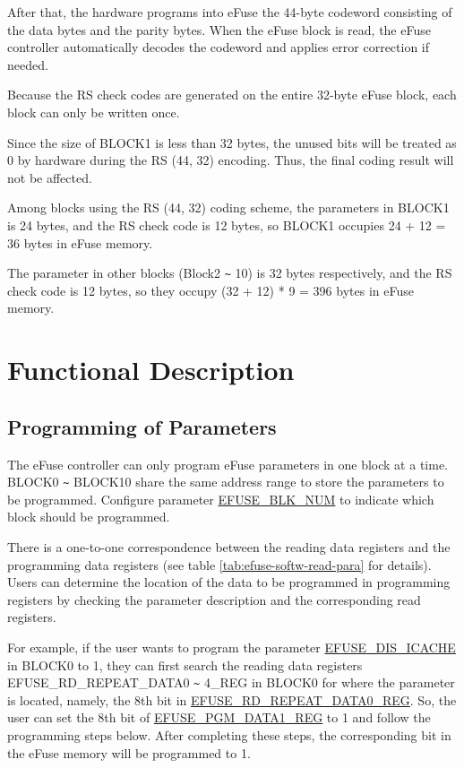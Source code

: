 \documentclass[main\_\_EN.tex]{subfiles}
\begin{document}
After that, the hardware programs into eFuse the 44-byte codeword consisting of the data bytes and the parity bytes. When the eFuse block is read, the eFuse controller automatically decodes the codeword and applies error correction if needed.

Because the RS check codes are generated on the entire 32-byte eFuse block, each block can only be written once.

Since the size of BLOCK1 is less than 32 bytes, the unused bits will be treated as 0 by hardware during the RS (44, 32) encoding. Thus, the final coding result will not be affected.

Among blocks using the RS (44, 32) coding scheme, the parameters in BLOCK1 is 24 bytes, and the RS check code is 12 bytes, so BLOCK1 occupies 24 + 12 = 36 bytes in eFuse memory.

The parameter in other blocks (Block2 \verb+~+ 10) is 32 bytes respectively, and the RS check code is 12 bytes, so they occupy (32 + 12) * 9 = 396 bytes in eFuse memory.


\section{Functional Description}
\label{sec:alias-func-descr}

\subsection{Programming of Parameters}
\label{sec:efuse-software-programming-para}

The eFuse controller can only program eFuse parameters in one block at a time. BLOCK0 \verb+~+ BLOCK10 share the same address range to store the parameters to be programmed. Configure parameter \hyperref[fielddesc:EFUSEBLKNUM]{EFUSE\_BLK\_NUM} to indicate which block should be programmed.

There is a one-to-one correspondence between the reading data registers and the programming data registers (see table \ref{tab:efuse-softw-read-para} for details). Users can determine the location of the data to be programmed in programming registers by checking the parameter description and the corresponding read registers.

For example, if the user wants to program the parameter \hyperref[fielddesc:EFUSEDISICACHE]{EFUSE\_DIS\_ICACHE} in BLOCK0 to 1, they can first search the reading data registers EFUSE\_RD\_REPEAT\_DATA0 \verb+~+ 4\_REG in BLOCK0 for where the parameter is located, namely, the 8th bit in \hyperref[regdesc:EFUSERDREPEATDATA0REG]{EFUSE\_RD\_REPEAT\_DATA0\_REG}. So, the user can set the 8th bit of \hyperref[regdesc:EFUSEPGMDATANREG]{EFUSE\_PGM\_DATA1\_REG} to 1 and follow the programming steps below. After completing these steps, the corresponding bit in the eFuse memory will be programmed to 1.
\end{document}
